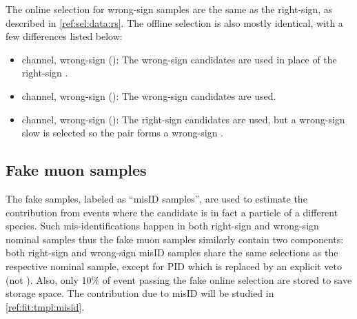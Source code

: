 The online selection for wrong-sign samples are the same as the right-sign,
as described in \cref{ref:sel:data:rs}.
The offline selection is also mostly identical, with a few differences listed
below:

\begin{itemize}
    \item \Dz channel, wrong-sign \muon (\BComb):
        The wrong-sign \Dz\mup candidates are used in place of the right-sign
        \Dz\mun.
    \item \Dstar channel, wrong-sign \muon (\BComb):
        The wrong-sign \Dz\mup candidates are used.
    \item \Dstar channel, wrong-sign \pion (\DstComb):
        The right-sign \Dz\mun candidates are used,
        but a wrong-sign slow \pim is selected so the \Dz\pim pair
        forms a wrong-sign \Dstarm.
\end{itemize}


\subsection{Fake muon samples}
\label{ref:sel:data:fake-mu}

The fake \muon samples,
labeled as ``misID samples'',
are used to estimate the contribution from events where
the \muon candidate is in fact a particle of a different species.
Such mis-identifications happen in both right-sign and wrong-sign nominal
samples thus the fake muon samples similarly contain two components:
both right-sign and wrong-sign misID samples share the same selections
as the respective nominal sample,
except for \muon PID which is replaced by an explicit \muon veto
(not \isMuon).
Also, only 10\% of event passing the fake \muon online selection are stored to
save storage space.
The contribution due to \muon misID will be studied in
\cref{ref:fit:tmpl:misid}.
